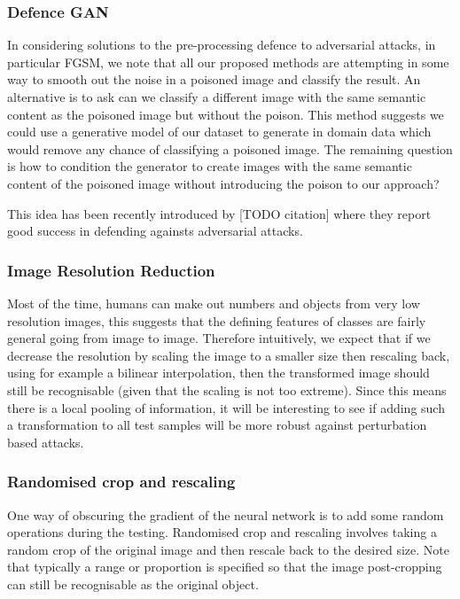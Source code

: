 \subsubsection{Defence GAN}
In considering solutions to the pre-processing defence to adversarial attacks, in particular FGSM, we note that all our proposed methods are attempting in some way to smooth out the noise in a poisoned image and classify the result. An alternative is to ask can we classify a different image with the same semantic content as the poisoned image but without the poison.  This method suggests we could use a generative model of our dataset to generate in domain data which would remove any chance of classifying a poisoned image.  The remaining question is how to condition the generator to create images with the same semantic content of the poisoned image without introducing the poison to our approach?

This idea has been recently introduced by [TODO citation] where they report good success in defending againsts adversarial attacks.


\subsubsection{Image Resolution Reduction}
Most of the time, humans can make out numbers and objects from very low resolution images, this suggests that the defining features of classes are fairly general going from image to image. Therefore intuitively, we expect that if we decrease the resolution by scaling the image to a smaller size then rescaling back, using for example a bilinear interpolation, then the transformed image should still be recognisable (given that the scaling is not too extreme). Since this means there is a local pooling of information, it will be interesting to see if adding such a transformation to all test samples will be more robust against perturbation based attacks.

\subsubsection{Randomised crop and rescaling}
One way of obscuring the gradient of the neural network is to add some random operations during the testing. Randomised crop and rescaling involves taking a random crop of the original image and then rescale back to the desired size. Note that typically a range or proportion is specified so that the image post-cropping can still be recognisable as the original object. 

